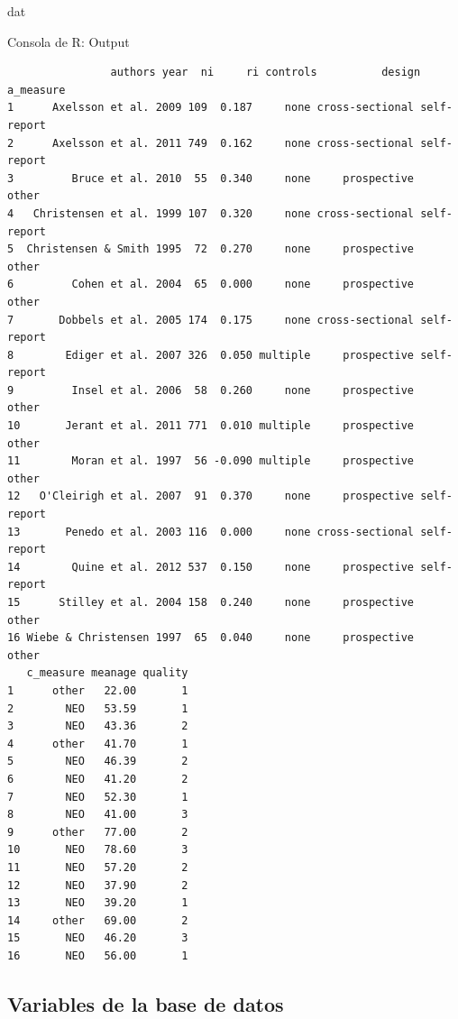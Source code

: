 \documentclass[
  bookmarksnumbered]{article}
\newenvironment{Shaded}{\begin{snugshade}}{\end{snugshade}}
\newcommand{\NormalTok}[1]{\textcolor[rgb]{0.12,0.11,0.11}{#1}}
\begin{document}
\begin{Shaded}
\begin{Highlighting}[]
\NormalTok{dat}
\end{Highlighting}
\end{Shaded}

\begin{ROut}{Consola de R: Output~\thetcbcounter}
                \begin{footnotesize}
                \begin{verbatim}                authors year  ni     ri controls          design   a_measure
1      Axelsson et al. 2009 109  0.187     none cross-sectional self-report
2      Axelsson et al. 2011 749  0.162     none cross-sectional self-report
3         Bruce et al. 2010  55  0.340     none     prospective       other
4   Christensen et al. 1999 107  0.320     none cross-sectional self-report
5  Christensen & Smith 1995  72  0.270     none     prospective       other
6         Cohen et al. 2004  65  0.000     none     prospective       other
7       Dobbels et al. 2005 174  0.175     none cross-sectional self-report
8        Ediger et al. 2007 326  0.050 multiple     prospective self-report
9         Insel et al. 2006  58  0.260     none     prospective       other
10       Jerant et al. 2011 771  0.010 multiple     prospective       other
11        Moran et al. 1997  56 -0.090 multiple     prospective       other
12   O'Cleirigh et al. 2007  91  0.370     none     prospective self-report
13       Penedo et al. 2003 116  0.000     none cross-sectional self-report
14        Quine et al. 2012 537  0.150     none     prospective self-report
15      Stilley et al. 2004 158  0.240     none     prospective       other
16 Wiebe & Christensen 1997  65  0.040     none     prospective       other
   c_measure meanage quality
1      other   22.00       1
2        NEO   53.59       1
3        NEO   43.36       2
4      other   41.70       1
5        NEO   46.39       2
6        NEO   41.20       2
7        NEO   52.30       1
8        NEO   41.00       3
9      other   77.00       2
10       NEO   78.60       3
11       NEO   57.20       2
12       NEO   37.90       2
13       NEO   39.20       1
14     other   69.00       2
15       NEO   46.20       3
16       NEO   56.00       1
 \end{verbatim}
                \end{footnotesize}
                \end{ROut}

\hypertarget{variables-de-la-base-de-datos}{%
\subsection{Variables de la base de datos}\label{variables-de-la-base-de-datos}}
\end{document}
